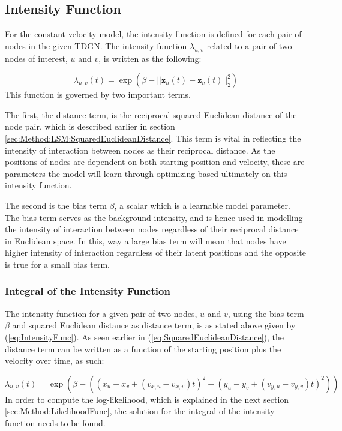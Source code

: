 \subsection{Intensity Function}
\label{sec:Method:IntensityFunc}
For the constant velocity model, the intensity function is defined for each pair of nodes in the given TDGN.
The intensity function $\lambda_{u,v}$ related to a pair of two nodes of interest, $u$ and $v$, is written as the following:

\begin{equation}
    \lambda_{u,v}(t)
    =
    \exp \left(\beta - ||\textbf{z}_u(t) - \textbf{z}_v(t)||_2^2\right)
    \label{eq:IntensityFunc}
\end{equation}
This function is governed by two important terms.

The first, the distance term, is the reciprocal squared Euclidean distance of the node pair, which is described earlier in section \ref{sec:Method:LSM:SquaredEuclideanDistance}.
This term is vital in reflecting the intensity of interaction between nodes as their reciprocal distance.
As the positions of nodes are dependent on both starting position and velocity, these are parameters the model will learn through optimizing based ultimately on this intensity function.

The second is the bias term $\beta$, a scalar which is a learnable model parameter. 
The bias term serves as the background intensity, and is hence used in modelling the intensity of interaction between nodes regardless of their reciprocal distance in Euclidean space. 
In this, way a large bias term will mean that nodes have higher intensity of interaction regardless of their latent positions and the opposite is true for a small bias term.


\subsubsection{Integral of the Intensity Function}
\label{sec:Method:IntensityFunc:IntegralIntensityFunc}
The intensity function for a given pair of two nodes, $u$ and $v$, using the bias term $\beta$ and squared Euclidean distance as distance term, is as stated above given by (\ref{eq:IntensityFunc}).
As seen earlier in (\ref{eq:SquaredEuclideanDistance}), the distance term can be written as a function of the starting position plus the velocity over time, as such:

\begin{equation}
    \lambda_{u,v}(t)
    =
    \exp \left(\beta - \left((x_u - x_v + (v_{x,u} - v_{x,v})t)^2 + (y_u - y_v + ( v_{y,u} - v_{y,v})t)^2\right)\right)
\end{equation}
In order to compute the log-likelihood, which is explained in the next section \ref{sec:Method:LikelihoodFunc}, the solution for the integral of the intensity function needs to be found. 


